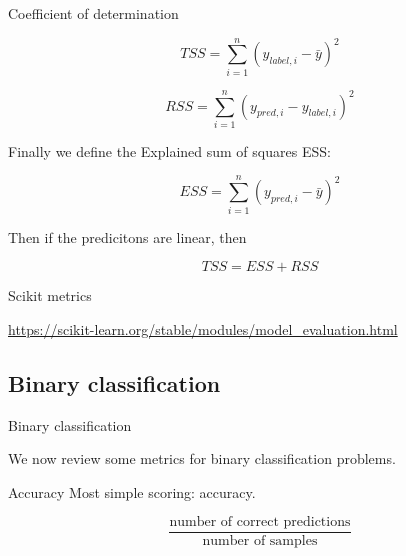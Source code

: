 \documentclass[usenames,dvipsnames,french]{beamer}
\begin{document}
\begin{frame}{Coefficient of determination}

    \begin{equation}
        TSS = \sum^{n}_{i=1} (y_{label, i}- \bar{y})^2
    \end{equation}

    \begin{equation}
        RSS = \sum^{n}_{i=1} (y_{pred, i}-y_{label, i})^2
    \end{equation}

    Finally we define the Explained sum of squares ESS: 

    \begin{equation}
        ESS = \sum^{n}_{i=1} (y_{pred, i}- \bar{y})^2
    \end{equation}

    Then if the predicitons are linear, then

    \begin{equation}
        TSS = ESS + RSS
    \end{equation}
    
\end{frame}

\begin{frame}{Scikit metrics}

    \url{https://scikit-learn.org/stable/modules/model_evaluation.html} 
    
\end{frame}


\subsection{Binary classification}%
\label{sub:classification}

\begin{frame}{Binary classification}

    We now review some metrics for binary classification problems.
\end{frame}


\begin{frame}{Accuracy}
   Most simple scoring: accuracy. 

   \begin{equation}
       \frac{\text{number of correct predictions}}{\text{number of samples}} 
   \end{equation}


\end{frame}
\end{document}
